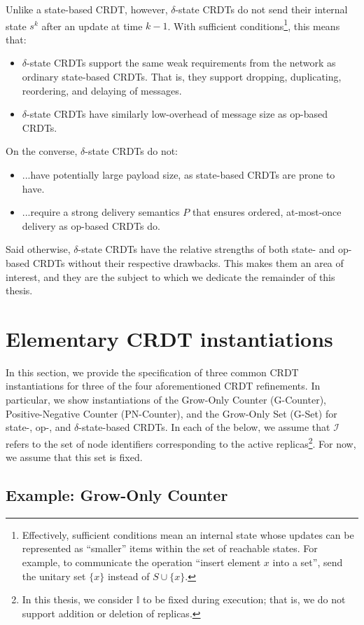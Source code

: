 Unlike a state-based CRDT, however, $\delta$-state CRDTs do not send their
internal state $s^k$ after an update at time $k-1$. With sufficient
conditions\footnote{Effectively, sufficient conditions mean an internal state
whose updates can be represented as ``smaller'' items within the set of
reachable states. For example, to communicate the operation ``insert element $x$
into a set'', send the unitary set $\{x\}$ instead of $S \cup \{ x \}$.}, this
means that:
\begin{itemize}
  \item $\delta$-state CRDTs support the same weak requirements from the network
    as ordinary state-based CRDTs. That is, they support dropping, duplicating,
    reordering, and delaying of messages.
  \item $\delta$-state CRDTs have similarly low-overhead of message size as
    op-based CRDTs.
\end{itemize}
On the converse, $\delta$-state CRDTs do not:
\begin{itemize}
  \item ...have potentially large payload size, as state-based CRDTs are prone
    to have.
  \item ...require a strong delivery semantics $P$ that ensures ordered,
    at-most-once delivery as op-based CRDTs do.
\end{itemize}
Said otherwise, $\delta$-state CRDTs have the relative strengths of both state-
and op-based CRDTs without their respective drawbacks. This makes them an area
of interest, and they are the subject to which we dedicate the remainder of this
thesis.

\section{Elementary CRDT instantiations}
In this section, we provide the specification of three common CRDT instantiations
for three of the four aforementioned CRDT refinements. In particular, we show
instantiations of the Grow-Only Counter (G-Counter), Positive-Negative Counter
(PN-Counter), and the Grow-Only Set (G-Set) for state-, op-, and
$\delta$-state-based CRDTs. In each of the below, we assume that $\mathcal{I}$
refers to the set of node identifiers corresponding to the active
replicas\footnote{In this thesis, we consider $\mathbb{I}$ to be fixed during
execution; that is, we do not support addition or deletion of replicas.}. For
now, we assume that this set is fixed.

\subsection{Example: Grow-Only Counter}
\label{sec:example-gcounter}

